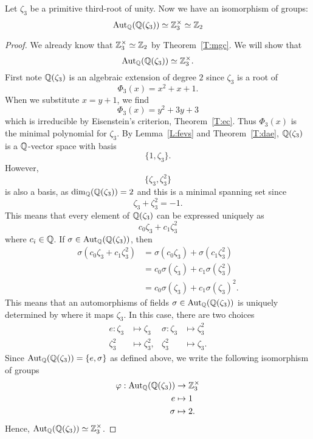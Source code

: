 \documentclass{ximera}
\begin{document}
\begin{example}[$\boldsymbol{\aut_{\pmb \Q}\pmb(\pmb\Q\pmb(\zeta_3\pmb)\pmb)}$]
  Let $\zeta_3$ be a primitive third-root of
  unity. Now we have an isomorphism of groups:
  \[
  \operatorname{Aut}_{\mathbb Q}(\mathbb Q(\zeta_3))\simeq\mathbb Z_3^\times\simeq \mathbb Z_2
  \]
  \begin{proof}
    We already know that $\mathbb Z_3^\times\simeq \mathbb Z_2$ by
    Theorem~\ref{T:mgc}. We will show that
    \[
    \operatorname{Aut}_{\mathbb Q}(\mathbb Q(\zeta_3))\simeq\mathbb Z_3^\times.
    \]
    First note $\mathbb Q(\zeta_3)$ is an algebraic extension of degree $2$
    since $\zeta_3$ is a root of
    \[
    \Phi_3(x) = x^2 + x + 1. 
    \]
    When we substitute $x = y+ 1$, we find
    \[
    \Phi_3(x) = y^2 + 3y + 3
    \]
    which is irreducible by Eisenstein's criterion,
    Theorem~\ref{T:ec}. Thus $\Phi_3(x)$ is the minimal polynomial for
    $\zeta_3$. By Lemma~\ref{L:fevs} and Theorem~\ref{T:dae},
    $\mathbb Q(\zeta_3)$ is a $\mathbb Q$-vector space with basis
    \[
    \{1,\zeta_3\}.
    \]
    However, 
    \[
    \{\zeta_3,\zeta_3^2\}
    \]
    is also a basis, as $\dim_\mathbb Q(\mathbb Q(\zeta_3))=2$ and this is a minimal
    spanning set since
    \[
    \zeta_3 + \zeta_3^2 = -1.
    \]
    This means that every element of $\mathbb Q(\zeta_3)$ can be expressed
    uniquely as
    \[
    c_0\zeta_3 + c_1 \zeta_3^2
    \]
    where $c_i\in\mathbb Q$. If $\sigma\in\operatorname{Aut}_\mathbb Q(\mathbb Q(\zeta_3))$, then
    \begin{align*}
      \sigma(c_0\zeta_3 + c_1 \zeta_3^2) &= \sigma(c_0\zeta_3) + \sigma(c_1 \zeta_3^2)\\
      &= c_0 \sigma(\zeta_3) + c_1 \sigma(\zeta_3^2)\\
      &= c_0 \sigma(\zeta_3) + c_1 \sigma(\zeta_3)^2.
    \end{align*}
    This means that an automorphisms of fields $\sigma \in
    \operatorname{Aut}_\mathbb Q(\mathbb Q(\zeta_3))$ is uniquely determined by where it maps
    $\zeta_3$. In this case, there are two choices
    \begin{align*}
      e :\zeta_3 &\mapsto \zeta_3 &  \sigma :\zeta_3 &\mapsto \zeta_3^2\\
         \zeta_3^2 &\mapsto \zeta_3^2, &          \zeta_3^2 &\mapsto \zeta_3.
    \end{align*}
    Since $\operatorname{Aut}_\mathbb Q(\mathbb Q(\zeta_3)) = \{e,\sigma\}$ as defined above, we
    write the following isomorphism of groups
    \begin{align*}
      \varphi: \operatorname{Aut}_\mathbb Q(\mathbb Q(\zeta_3)) &\to \mathbb Z_3^\times\\
      e &\mapsto 1\\
      \sigma &\mapsto 2.
    \end{align*}
    Hence, $\operatorname{Aut}_\mathbb Q(\mathbb Q(\zeta_3))\simeq\mathbb Z_3^\times$.
  \end{proof}
\end{example}
\end{document}
